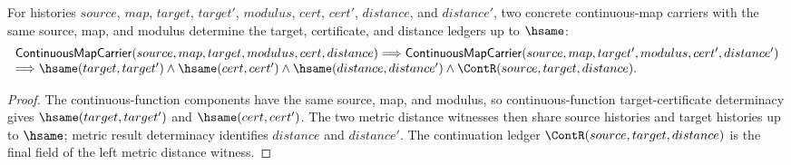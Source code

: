 \begin{theorem}
\label{thm:continuousmap-target-cert-distance-deterministic}
For histories $source$, $map$, $target$, $target'$, $modulus$, $cert$, $cert'$,
$distance$, and $distance'$, two concrete continuous-map carriers with the same
source, map, and modulus determine the target, certificate, and distance
ledgers up to $\hsame$:
$$
\begin{array}{l}
\mathsf{ContinuousMapCarrier}(source,map,target,modulus,cert,distance)
\Longrightarrow
\mathsf{ContinuousMapCarrier}(source,map,target',modulus,cert',distance')
\\
\Longrightarrow
\hsame(target,target')\land\hsame(cert,cert')\land
\hsame(distance,distance')\land\ContR(source,target,distance).
\end{array}
$$
\end{theorem}
\begin{proof}
The continuous-function components have the same source, map, and modulus, so
continuous-function target-certificate determinacy gives
$\hsame(target,target')$ and $\hsame(cert,cert')$. The two metric distance
witnesses then share source histories and target histories up to $\hsame$;
metric result determinacy identifies $distance$ and $distance'$. The
continuation ledger $\ContR(source,target,distance)$ is the final field of the
left metric distance witness.
\end{proof}

